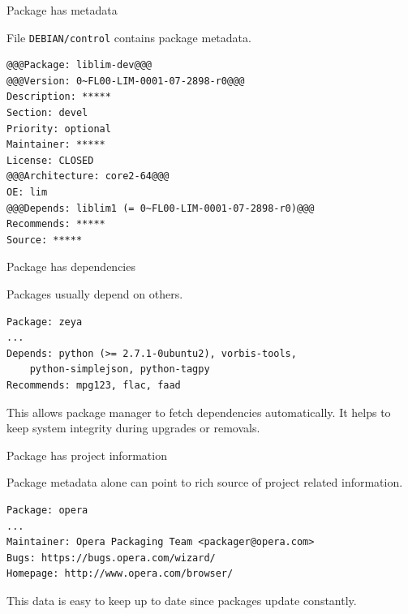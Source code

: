 \documentclass{beamer}
\begin{document}
\begin{frame}[fragile]{Package has metadata}
    \begin{block}{}
        File \verb|DEBIAN/control| contains package metadata.
    \end{block}
\begin{lstlisting}[style=Console]
@@@Package: liblim-dev@@@
@@@Version: 0~FL00-LIM-0001-07-2898-r0@@@
Description: *****
Section: devel
Priority: optional
Maintainer: *****
License: CLOSED
@@@Architecture: core2-64@@@
OE: lim
@@@Depends: liblim1 (= 0~FL00-LIM-0001-07-2898-r0)@@@
Recommends: *****
Source: *****
\end{lstlisting}
\end{frame}

\begin{frame}[fragile]{Package has dependencies}
    \begin{block}{}
        Packages usually depend on others.
    \end{block}
\begin{lstlisting}[style=Console]
Package: zeya
...
Depends: python (>= 2.7.1-0ubuntu2), vorbis-tools,
    python-simplejson, python-tagpy
Recommends: mpg123, flac, faad
\end{lstlisting}
    \begin{block}{}
        This allows package manager to fetch dependencies
        automatically. It helps to keep system integrity
        during upgrades or removals.
    \end{block}
\end{frame}

\begin{frame}[fragile]{Package has project information}
    \begin{block}{}
        Package metadata alone can point to
        rich source of project related information.
    \end{block}
\begin{lstlisting}[style=Console]
Package: opera
...
Maintainer: Opera Packaging Team <packager@opera.com>
Bugs: https://bugs.opera.com/wizard/
Homepage: http://www.opera.com/browser/
\end{lstlisting}
    \begin{block}{}
        This data is easy to keep up to date since
        packages update constantly.
    \end{block}
\end{frame}
\end{document}
